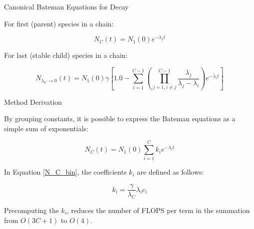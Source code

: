 \documentclass[xcolor=x11names,compress]{beamer}
\begin{document}

\begin{frame}{Canonical Bateman Equations for Decay}

    For first (parent) species in a chain:

\begin{equation}
\label{N_C}
N_C(t) = N_1(0) e^{-\lambda_1 t}
\end{equation}

    \vspace*{2em}
    For last (stable child) species in a chain:

\begin{equation}
\label{lim_lam_N_C}
N_{\lambda_C \to 0}(t) = N_1(0)  \gamma \left[1.0 - \sum_{i=1}^{C-1} \left(\prod_{j=1,i\ne j}^{C-1} \frac{\lambda_j}{\lambda_j - \lambda_i} \right) e^{-\lambda_i t} \right]
\end{equation}

\end{frame}


\begin{frame}{Method Derivation}

    By grouping constants, it is possible to express the Bateman equations 
    as a simple sum of exponentials:

    \begin{equation}
    \label{N_C_bin}
    N_C(t) = N_1(0) \sum_{i=1}^C k_{i} e^{-\lambda_i t}
    \end{equation}

    \vspace*{1em}
    In Equation \ref{N_C_bin}, the coefficients $k_i$ are defined as follows:

    \begin{equation}
    \label{k_i}
    k_i = \frac{\gamma}{\lambda_C} \lambda_i c_i
    \end{equation}

    \vspace*{1em}
    Precomputing the $k_i$, reduces the number of FLOPS per term in the 
    summation from $O(3C+1)$ to $O(4)$.

\end{frame}

\end{document}

